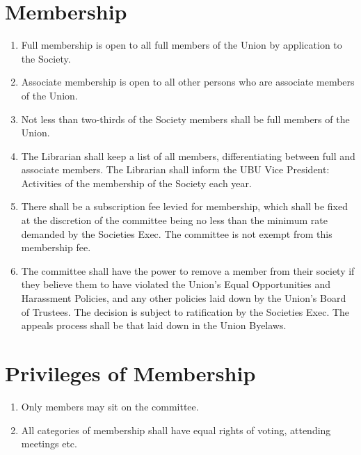 \documentclass[a4paper,10pt]{article}
\begin{document}
\section{Membership}
\begin{enumerate}
  \item Full membership is open to all full members of the Union by application to the Society.
  \item Associate membership is open to all other persons who are associate members of the Union.
  \item Not less than two-thirds of the Society members shall be full members of the Union.
  \item The Librarian shall keep a list of all members, differentiating between full and associate members. The Librarian shall inform the UBU Vice President: Activities of the membership of the Society each year.
  \item There shall be a subscription fee levied for membership, which shall be fixed at the discretion of the committee being no less than the minimum rate demanded by the Societies Exec. The committee is not exempt from this membership fee.
  \item The committee shall have the power to remove a member from their society if they believe them to have violated the Union's Equal Opportunities and Harassment Policies, and any other policies laid down by the Union's Board of Trustees. The decision is subject to ratification by the Societies Exec. The appeals process shall be that laid down in the Union Byelaws.
\end{enumerate}

\section{Privileges of Membership}
\begin{enumerate}
  \item Only members may sit on the committee.
  \item All categories of membership shall have equal rights of voting, attending meetings etc.
\end{enumerate}
\end{document}
